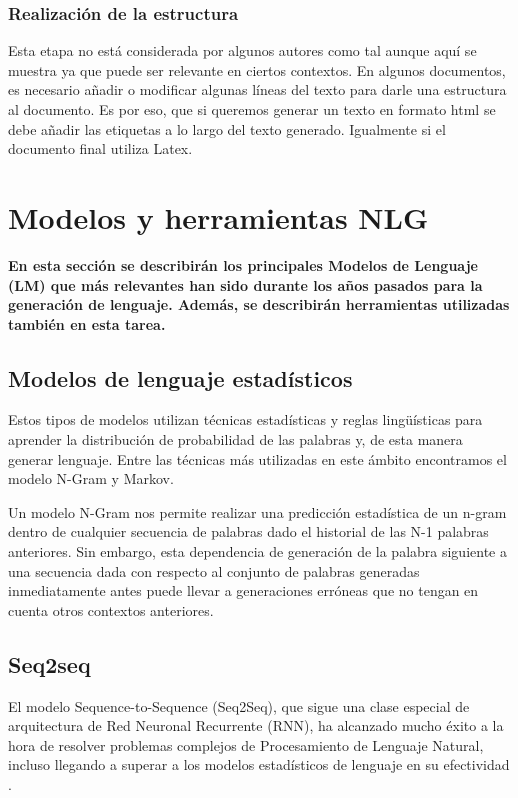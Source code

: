 \subsubsection{Realización de la estructura}
Esta etapa no está considerada por algunos autores como tal aunque aquí se muestra ya que puede ser relevante en ciertos contextos. 
En algunos documentos, es necesario añadir o modificar algunas líneas del texto para darle una estructura al documento. Es por eso, que si queremos generar un texto en formato html se debe añadir las etiquetas a lo largo del texto generado. Igualmente si el documento final utiliza Latex.


\section{Modelos y herramientas NLG}
\textbf{En esta sección se describirán los principales Modelos de Lenguaje (LM) que más relevantes han sido durante los años pasados para la generación de lenguaje. Además, se describirán herramientas utilizadas también en esta tarea.}


\subsection{Modelos de lenguaje estadísticos}
Estos tipos de modelos utilizan técnicas estadísticas y reglas lingüísticas para aprender la distribución de probabilidad de las palabras y, de esta manera generar lenguaje. Entre las técnicas más utilizadas en este ámbito encontramos el modelo N-Gram y Markov.

Un modelo N-Gram nos permite realizar una predicción estadística de un n-gram dentro de cualquier secuencia de palabras dado el historial de las N-1 palabras anteriores. Sin embargo, esta dependencia de generación de la palabra siguiente a una secuencia dada con respecto al conjunto de palabras generadas inmediatamente antes puede llevar a generaciones erróneas que no tengan en cuenta otros contextos anteriores.

\subsection{Seq2seq}
El modelo Sequence-to-Sequence (Seq2Seq), que sigue una clase especial de arquitectura de Red Neuronal Recurrente (RNN), ha alcanzado mucho éxito a la hora de resolver problemas complejos de Procesamiento de Lenguaje Natural, incluso llegando a superar a los modelos estadísticos de lenguaje en su efectividad \citep{analytics_vidhya_2020}.

